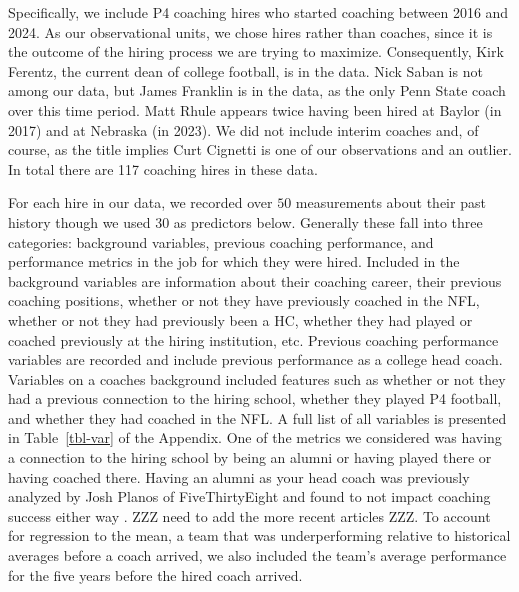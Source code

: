 \documentclass[
  12pt]{article}
\begin{document}
Specifically, we include P4 coaching hires who started coaching between
2016 and 2024. As our observational units, we chose hires rather than
coaches, since it is the outcome of the hiring process we are trying to
maximize. Consequently, Kirk Ferentz, the current dean of college
football, is in the data. Nick Saban is not among our data, but James
Franklin is in the data, as the only Penn State coach over this time
period. Matt Rhule appears twice having been hired at Baylor (in 2017)
and at Nebraska (in 2023). We did not include interim coaches and, of
course, as the title implies Curt Cignetti is one of our observations
and an outlier. In total there are 117 coaching hires in these data.

For each hire in our data, we recorded over \(50\) measurements about
their past history though we used 30 as predictors below. Generally
these fall into three categories: background variables, previous
coaching performance, and performance metrics in the job for which they
were hired. Included in the background variables are information about
their coaching career, their previous coaching positions, whether or not
they have previously coached in the NFL, whether or not they had
previously been a HC, whether they had played or coached previously at
the hiring institution, etc. Previous coaching performance variables are
recorded and include previous performance as a college head coach.
Variables on a coaches background included features such as whether or
not they had a previous connection to the hiring school, whether they
played P4 football, and whether they had coached in the NFL. A full list
of all variables is presented in Table~\ref{tbl-var} of the Appendix.
One of the metrics we considered was having a connection to the hiring
school by being an alumni or having played there or having coached
there. Having an alumni as your head coach was previously analyzed by
Josh Planos of FiveThirtyEight and found to not impact coaching success
either way \citep{alumni_538}. ZZZ need to add the more recent articles
ZZZ. To account for regression to the mean, a team that was
underperforming relative to historical averages before a coach arrived,
we also included the team's average performance for the five years
before the hired coach arrived.
\end{document}
